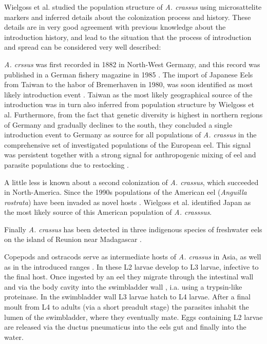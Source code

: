 Wielgoss et al. \cite{wielgoss_population_2008} studied the population
structure of \textit{A. crassus} using microsattelite markers and
inferred details about the colonization process and history. These
details are in very good agreement with previous knowledge about the
introduction history, and lead to the situation that the process of
introduction and spread can be considered very well described:

\textit{A. crssus} was first recorded in 1882 in North-West Germany,
and this record was published in a German fishery magazine in 1985
\cite{fischer_teichwirt}. The import of Japanese Eels from Taiwan to
the habor of Bremerhaven in 1980, was soon identified as most likely
introduction event \cite{koops_anguillicola-infestations_1989}. Taiwan
as the most likely geographical source of the introduction was in turn
also inferred from population structure by Wielgoss et
al. Furthermore, from the fact that genetic diversity is highest in
northern regions of Germany and gradually declines to the south, they
concluded a single introduction event to Germany as source for all
populations of \textit{A. crassus} in the comprehensive set of
investigated populations of the European eel. This signal was
persistent together with a strong signal for anthropogenic mixing of
eel and parasite populations due to restocking \cite{pmid20646147}.



A little less is known about a second colonization of
\textit{A. crassus}, which succeeded in North-America. Since the 1990s
populations of the American eel (\textit{Anguilla rostrata}) have been
invaded as novel hosts \cite{fries_notes:_1996,barse_exotic_1999,
  barse_swimbladder_2001}. Wielgoss et al. identified Japan as the
most likely source of this American population of
\textit{A. crasssus}.

Finally \textit{A. crassus} has been detected in three indigenous
species of freshwater eels on the island of Reunion near Madagascar
\cite{sasal_parasite_2008}.

Copepods and ostracods serve as intermediate hosts of
\textit{A. crassus} in Asia, as well as in the introduced ranges
\cite{moravec_first_2005}. In these L2 larvae develop to L3 larvae,
infective to the final host. Once ingested by an eel they migrate
through the intestinal wall and via the body cavity into the
swimbladder wall \cite{haenen_effects_1996}, i.a. using a trypsin-like
proteinase\cite{polzer_identification_1993}. In the swimbladder wall
L3 larvae hatch to L4 larvae. After a final moult from L4 to adults
(via a short preadult stage) the parasites inhabit the lumen of the
swimbladder, where they eventually mate. Eggs containing L2 larvae are
released via the ductus pneumaticus into the eels gut and finally into
the water\cite{de_charleroy_life_1990}.

